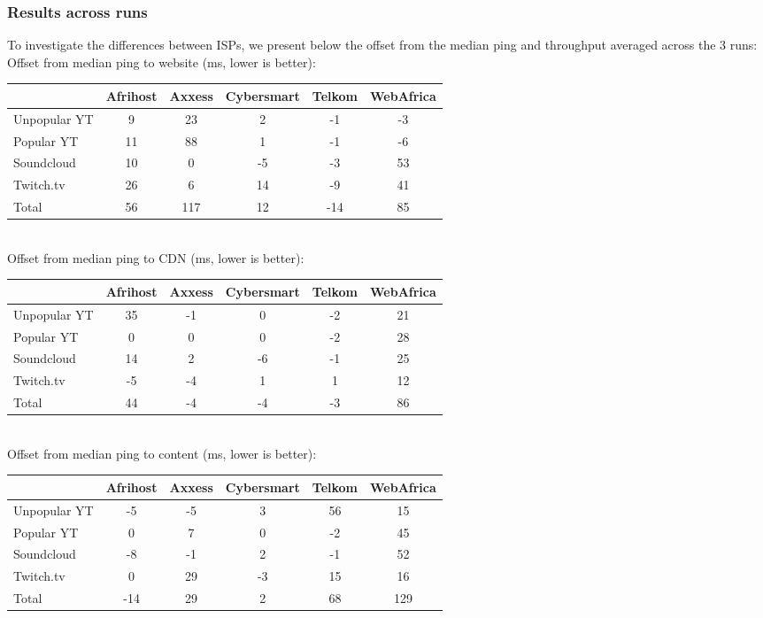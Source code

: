 \documentclass{sig-alternate-05-2015}
\begin{document}
\subsubsection{Results across runs}
To investigate the differences between ISPs, we present below the offset from the median ping and throughput averaged across the 3 runs:
\vspace{1em} \\
Offset from median ping to website (ms, lower is better): \\
{\small
\begin{tabular}{|l|c|c|c|c|c|} \hline
 & \small{Afrihost} & \small{Axxess} & \small{Cybersmart} & \small{Telkom} & \small{WebAfrica} \\ \hline
\small{Unpopular YT} & 9  & 23  & 2  & -1  & -3 \\ \hline
Popular YT           & 11 & 88  & 1  & -1  & -6 \\ \hline
Soundcloud           & 10 & 0   & -5 & -3  & 53 \\ \hline
Twitch.tv            & 26 & 6   & 14 & -9  & 41 \\ \hline
Total                & 56 & 117 & 12 & -14 & 85 \\ \hline
\end{tabular}}
\vspace{1em} \\
Offset from median ping to CDN (ms, lower is better): \\
{\small
\begin{tabular}{|l|c|c|c|c|c|} \hline
 & \small{Afrihost} & \small{Axxess} & \small{Cybersmart} & \small{Telkom} & \small{WebAfrica} \\ \hline
\small{Unpopular YT} & 35 & -1 & 0  & -2 & 21 \\ \hline
Popular YT           & 0  & 0  & 0  & -2 & 28 \\ \hline
Soundcloud           & 14 & 2  & -6 & -1 & 25 \\ \hline
Twitch.tv            & -5 & -4 & 1  & 1  & 12 \\ \hline
Total                & 44 & -4 & -4 & -3 & 86 \\ \hline
\end{tabular}}
\vspace{1em} \\
Offset from median ping to content (ms, lower is better): \\
{\small
\begin{tabular}{|l|c|c|c|c|c|} \hline
 & \small{Afrihost} & \small{Axxess} & \small{Cybersmart} & \small{Telkom} & \small{WebAfrica} \\ \hline
\small{Unpopular YT} & -5  & -5 & 3  & 56 & 15 \\ \hline
Popular YT           & 0   & 7  & 0  & -2 & 45 \\ \hline
Soundcloud           & -8  & -1 & 2  & -1 & 52 \\ \hline
Twitch.tv            & 0   & 29 & -3 & 15 & 16 \\ \hline
Total                & -14 & 29 & 2  & 68 & 129 \\ \hline
\end{tabular}}
\end{document}
